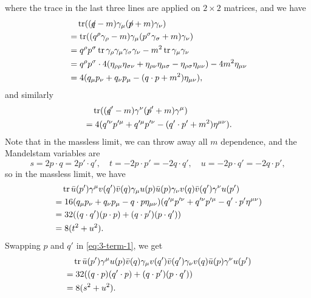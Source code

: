 \documentclass[hyperref, a4paper]{article}
\newcommand{\fsl}[1]{{\centernot{#1}}}
\begin{document}
where the trace in the last three lines are applied on $2\times 2$ matrices, and we have
\[
    \begin{aligned}
        &\quad \trace ( (\fsl{q} - m) \gamma_\mu (\fsl{p} + m) \gamma_\nu ) \\
        &= \trace( (q^\rho \gamma_\rho - m) \gamma_\mu (p^\sigma \gamma_\sigma + m) \gamma_\nu ) \\
        &= q^\rho p^\sigma \trace \gamma_\rho \gamma_\mu \gamma_\sigma \gamma_\nu - m^2 \trace \gamma_\mu \gamma_\nu \\
        &= q^\rho p^\sigma \cdot 4 (\eta_{\rho \mu} \eta_{\sigma \nu} + \eta_{\rho \nu} \eta_{\mu \sigma} - \eta_{\rho \sigma} \eta_{\mu \nu}) - 4 m^2 \eta_{\mu \nu} \\
        &= 4 (q_\mu p_\nu + q_\nu p_\mu - (q \cdot p + m^2) \eta_{\mu \nu}),
    \end{aligned}
\]
and similarly 
\[
    \begin{aligned}
        &\quad \trace( (\fsl{q}' - m) \gamma^\nu (\fsl{p}' + m) \gamma^\mu ) \\
        &= 4 (q'^\nu p'^\mu + q'^\mu p'^\nu - (q' \cdot p' + m^2) \eta^{\mu \nu}).
    \end{aligned}
\]
Note that in the massless limit, we can throw away all $m$ dependence, and the Mandelstam variables are 
\begin{equation}
    s = 2 p \cdot q = 2 p' \cdot q', \quad t = - 2 p \cdot p' = - 2 q \cdot q', \quad u = - 2 p \cdot q' = - 2 q \cdot p',
\end{equation}
so in the massless limit, we have 
\begin{equation}
    \begin{aligned}
        &\quad \trace \bar{u}(p') \gamma^\mu v(q') \bar{v}(q) \gamma_\mu u(p) \bar{u}(p) \gamma_\nu v(q) \bar{v}(q') \gamma^\nu u(p') \\
        &= 16 (q_\mu p_\nu + q_\nu p_\mu - q \cdot p  \eta_{\mu \nu}) (q'^\mu p'^\nu + q'^\nu p'^\mu - q' \cdot p' \eta^{\mu \nu}) \\
        &= 32 ( (q \cdot q') (p \cdot p) + (q \cdot p') (p \cdot q') ) \\
        &= 8 (t^2 + u^2).
    \end{aligned}
    \label{eq:3-term-1}
\end{equation}
Swapping $p$ and $q'$ in \eqref{eq:3-term-1}, we get 
\begin{equation}
    \begin{aligned}
        &\quad \trace \bar{u}(p') \gamma^\mu u(p) \bar{v}(q) \gamma_\mu v(q') \bar{v}(q') \gamma_\nu v(q) \bar{u}(p) \gamma^\nu u(p') \\
        &= 32 ( (q \cdot p) (q' \cdot p) + (q \cdot p') (p \cdot q') ) \\
        &= 8(s^2 + u^2).
    \end{aligned}
    \label{eq:3-term-2}
\end{equation}
\end{document}
